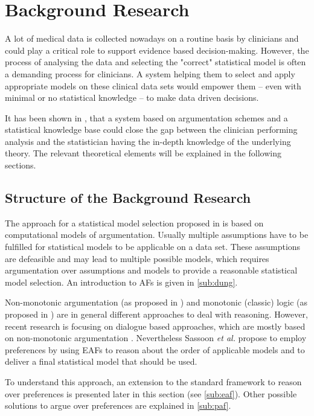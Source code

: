 \section{Background Research}
\label{sec:background}

A lot of medical data is collected nowadays on a routine basis by clinicians and could play a critical role to support evidence based decision-making. However, the process of analysing the data and selecting the "correct" statistical model is often a demanding process for clinicians. A system helping them to select and apply appropriate models on these clinical data sets would empower them -- even with minimal or no statistical knowledge -- to make data driven decisions. 

It has been shown in \cite{sassoon2014}, that a system based on argumentation schemes and a statistical knowledge base could close the gap between the clinician performing analysis and the statistician having the in-depth knowledge of the underlying theory. The relevant theoretical elements will be explained in the following sections.


\subsection{Structure of the Background Research}

The approach for a statistical model selection proposed in \cite{sassoon2014} is based on computational models of argumentation. Usually multiple assumptions have to be fulfilled for statistical models to be applicable on a data set. These assumptions are defeasible and may lead to multiple possible models, which requires argumentation over assumptions and models to provide a reasonable statistical model selection. An introduction to \glspl{AF} is given in \autoref{sub:dung}. 

Non-monotonic argumentation (as proposed in \cite{dung1995,liao}) and monotonic (classic) logic (as proposed in \cite{Reiter1980}) are in general different approaches to deal with reasoning. However, recent research is focusing on dialogue based approaches, which are mostly based on non-monotonic argumentation \cite{parsons2000,Walton1995}. 
Nevertheless Sassoon \textit{et al.} propose to employ preferences by using \glspl{EAF} to reason about the order of applicable models and to deliver a final statistical model that should be used. 

To understand this approach, an extension to the standard framework to reason over preferences is presented later in this section (see \autoref{sub:eaf}). Other possible solutions to argue over preferences are explained in \autoref{sub:paf}.

